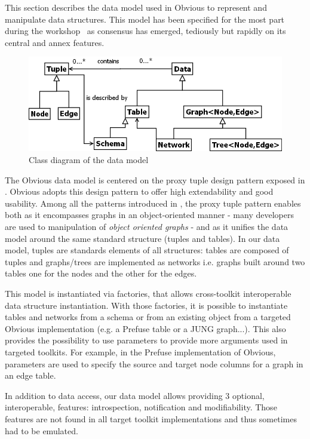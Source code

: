 This section describes the data model used in Obvious to represent and manipulate data structures.
This model has been  specified for the most part during the workshop~\cite{vismaster2008} as consensus has emerged, tediously but rapidly on its central and annex features.

\begin{figure}[!ht]
\includegraphics[width=\columnwidth]{figures/obviousdataclass}
\caption{Class diagram of the data model}
\label{fig:datamodel}
\end{figure}

The Obvious data model is centered on the proxy tuple design pattern exposed in \cite{DesignPatternsIV}. Obvious adopts this design pattern to offer high extendability and good usability. Among all the patterns introduced in \cite{DesignPatternsIV}, the proxy tuple pattern enables both as it encompasses graphs in an object-oriented manner - many developers are used to manipulation of \emph{object oriented graphs} - and as it unifies the data model around the same standard structure (tuples and tables). In our data model, tuples are standards elements of all structures: tables are composed of tuples and graphs/trees are implemented as networks i.e. graphs built around two tables one for the nodes and the other for the edges. 

This model is instantiated via factories, that allows cross-toolkit interoperable data structure instantiation. With those factories, it is possible to instantiate tables and networks from a schema or from an existing object from a targeted Obvious implementation (e.g. a Prefuse table or a JUNG graph...). This also provides the possibility to use parameters to provide more arguments used in targeted toolkits. For example, in the Prefuse implementation of Obvious, parameters are used to specify the source and target node columns for a graph in an edge table.

In addition to data access, our data model allows providing 3 optional, interoperable, features: introspection, notification and modifiability. Those features are not found in all target toolkit implementations and thus sometimes had to be emulated.
 
